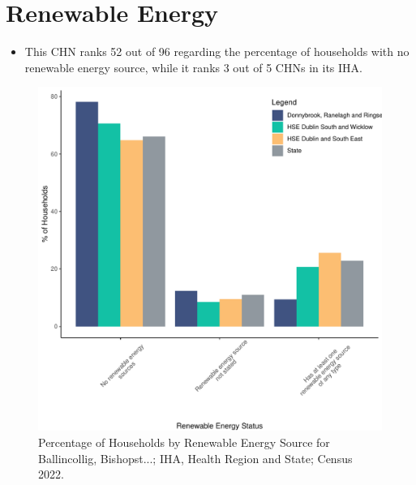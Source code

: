 \documentclass{article}
\begin{document}
\section{Renewable Energy}\label{sect:RE}
\begin{itemize}
\item This CHN ranks  52 out of 96 regarding the percentage of households with no renewable energy source, while it ranks   3 out of 5 CHNs in its IHA.
\end{itemize}
\begin{figure}[H]
	\centering
	\includegraphics[width = 140mm]{../figures/RenewableEnergyED.pdf}
	\caption{Percentage of Households by Renewable Energy Source for Ballincollig, Bishopst...; IHA, Health Region and State; Census 2022.}
	\label{fig:vbnv}
	\end{figure}
\end{document}
